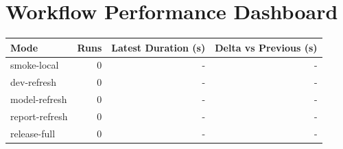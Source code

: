 \documentclass{article}
\begin{document}
\section*{Workflow Performance Dashboard}
\begin{tabular}{lrrr}
Mode & Runs & Latest Duration (s) & Delta vs Previous (s) \\
\hline
smoke-local & 0 & - & - \\
dev-refresh & 0 & - & - \\
model-refresh & 0 & - & - \\
report-refresh & 0 & - & - \\
release-full & 0 & - & - \\
\end{tabular}
\end{document}

